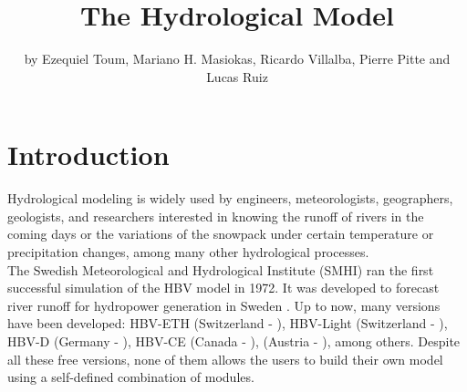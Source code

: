 \title{The  Hydrological Model}
\author{by Ezequiel Toum, Mariano H. Masiokas, Ricardo Villalba, Pierre Pitte and Lucas Ruiz}

\maketitle



\section{Introduction}

Hydrological modeling is widely used by engineers, meteorologists, geographers, geologists, and researchers interested in knowing
the runoff of rivers in the coming days or the variations of the snowpack under certain temperature or precipitation changes, 
among many other hydrological processes.\\
The Swedish Meteorological and Hydrological Institute (SMHI) ran the first successful simulation of the HBV model in 1972.
It was developed to forecast river runoff for hydropower generation in Sweden \citep{bergstrom:2015}. Up to now,
many versions have been developed: HBV-ETH (Switzerland - \citet{braun:1992} ), HBV-Light (Switzerland - \citet{seibert:2012} ), 
HBV-D (Germany - \citet{krysanova:1999} ), HBV-CE (Canada - \citet{stahl_hbv:2008} ), 
(Austria - \citet{viglione:2016} ), among others. Despite all these free versions, none of them allows the users 
to build their own model using a self-defined combination of modules.


